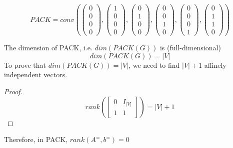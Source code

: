                     \begin{equation*}
                        PACK = conv\left(
                            \left(\begin{matrix}0 \\ 0 \\ 0 \\ 0\end{matrix}\right),
                            \left(\begin{matrix}1 \\ 0 \\ 0 \\ 0\end{matrix}\right),
                            \left(\begin{matrix}0 \\ 1 \\ 0 \\ 0\end{matrix}\right),
                            \left(\begin{matrix}0 \\ 0 \\ 1 \\ 0\end{matrix}\right),
                            \left(\begin{matrix}0 \\ 0 \\ 0 \\ 1\end{matrix}\right),
                            \left(\begin{matrix}0 \\ 1 \\ 1 \\ 0\end{matrix}\right)
                            \right)\nonumber
                    \end{equation*}

                    The dimension of PACK, i.e. $dim(PACK(G))$ is (full-dimensional)
                    \begin{equation*}
                        dim(PACK(G)) = |V| \nonumber
                    \end{equation*}
                    To prove that $dim(PACK(G)) = |V|$, we need to find $|V| + 1$ affinely independent vectors.\\
                    \begin{proof}
                        \begin{equation*}
                            rank\left(\left[\begin{matrix}0 & I_{|V|} \\ 1 & 1\end{matrix}\right]\right) = |V| + 1 \nonumber
                        \end{equation*}
                    \end{proof}                    
                    Therefore, in PACK, $rank(A^=,b^=)=0$ 

